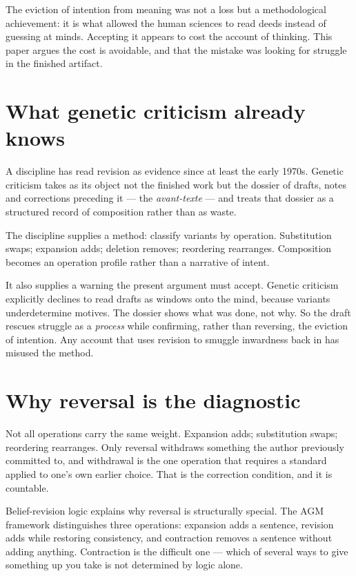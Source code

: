 \documentclass[11pt,a4paper]{article}
\begin{document}
The eviction of intention from meaning was not a loss but a methodological achievement: it is what allowed the human sciences to read deeds instead of guessing at minds. Accepting it appears to cost the account of thinking. This paper argues the cost is avoidable, and that the mistake was looking for struggle in the finished artifact.

\section{What genetic criticism already knows}
A discipline has read revision as evidence since at least the early 1970s. Genetic criticism takes as its object not the finished work but the dossier of drafts, notes and corrections preceding it --- the \emph{avant-texte} --- and treats that dossier as a structured record of composition rather than as waste.

The discipline supplies a method: classify variants by operation. Substitution swaps; expansion adds; deletion removes; reordering rearranges. Composition becomes an operation profile rather than a narrative of intent.

It also supplies a warning the present argument must accept. Genetic criticism explicitly declines to read drafts as windows onto the mind, because variants underdetermine motives. The dossier shows what was done, not why. So the draft rescues struggle as a \emph{process} while confirming, rather than reversing, the eviction of intention. Any account that uses revision to smuggle inwardness back in has misused the method.

\section{Why reversal is the diagnostic}
Not all operations carry the same weight. Expansion adds; substitution swaps; reordering rearranges. Only reversal withdraws something the author previously committed to, and withdrawal is the one operation that requires a standard applied to one's own earlier choice. That is the correction condition, and it is countable.

Belief-revision logic explains why reversal is structurally special. The AGM framework distinguishes three operations: expansion adds a sentence, revision adds while restoring consistency, and contraction removes a sentence without adding anything. Contraction is the difficult one --- which of several ways to give something up you take is not determined by logic alone.
\end{document}
